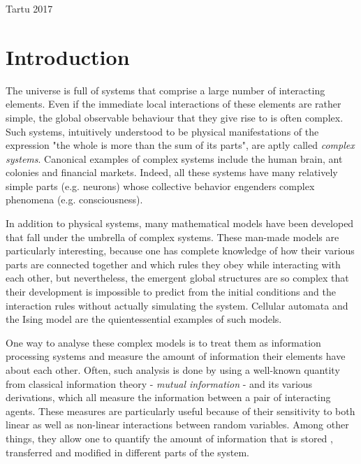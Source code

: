 \documentclass[12pt]{article}
\begin{document}
\vfill
\centerline{Tartu 2017}



\newpage
\tableofcontents

\newpage
\section*{Introduction}



The universe is full of systems that comprise a large number of interacting elements. Even if the immediate local interactions of these elements are rather simple, the global observable behaviour that they give rise to is often complex. Such systems, intuitively understood to be physical manifestations of the expression "the whole is more than the sum of its parts", are aptly called \textit{complex systems}. Canonical examples of complex systems include the human brain, ant colonies and financial markets. Indeed, all these systems have many relatively simple parts (e.g. neurons) whose collective behavior engenders complex phenomena (e.g. consciousness). 

In addition to physical systems, many mathematical models have been developed that fall under the umbrella of complex systems. These man-made models are particularly interesting, because one has complete knowledge of how their various parts are connected together and which rules they obey while interacting with each other, but nevertheless, the emergent global structures are so complex that their development is impossible to predict from the initial conditions and the interaction rules without actually simulating the system.  Cellular automata and the Ising model are the quientessential examples of such models.

One way to analyse these complex models is to treat them as information processing systems and measure the amount of information their elements have about each other. Often, such analysis is done by using a well-known quantity from classical information theory - \textit{mutual information} - and its various derivations, which all measure the information between a pair of interacting agents. These measures are particularly useful because of their sensitivity to both linear as well as non-linear interactions between random variables. Among other things, they allow one to quantify the amount of information that is stored \cite{active-inf-storage}, transferred \cite{transfer-entropy} and modified \cite{inf-modification} in different parts of the system.
\end{document}
